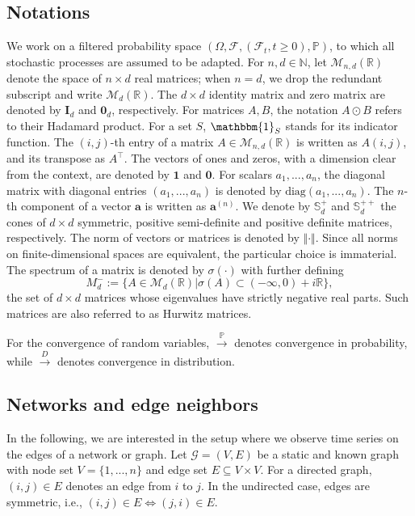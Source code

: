 \documentclass[12pt]{amsart}
\numberwithin{equation}{section}
\newcommand{\R}{\mathbb{R}}
\newcommand{\N}{\mathbb{N}}
\newcommand{\1}{\mathbf{1}}
\begin{document}
\subsection{Notations}
We work on a filtered probability space $(\Omega,\mathcal{F},(\mathcal{F}_t,t\geq 0),\mathbb{P})$, to which all stochastic processes are assumed to be adapted. For $n,d\in\N$, let $\mathcal{M}_{n,d}(\mathbb{R})$ denote the space of $n\times d$ real matrices; when $n=d$, we drop the redundant subscript and write $\mathcal{M}_{d}(\mathbb{R})$. The $d\times d$ identity matrix and zero matrix are denoted by $\mathbf{I}_{d}$ and $\mathbf{0}_{d}$, respectively. For matrices $A,B$, the notation $A\odot B$ refers to their Hadamard product. For a set $S$, $\mathbbm{1}_{S}$ stands for its indicator function. The $(i,j)$-th entry of a matrix $A\in\mathcal{M}_{n,d}(\mathbb{R})$ is written as $A(i,j)$, and its transpose as $A^{\top}$. The vectors of ones and zeros, with a dimension clear from the context, are denoted by $\mathbf{1}$ and $\mathbf{0}$. For scalars $a_1,...,a_n$, the diagonal matrix with diagonal entries $(a_1,...,a_n)$ is denoted by $\text{diag}(a_1,...,a_n)$. The $n$-th component of a vector $\mathbf{a}$ is written as $\mathbf{a}^{(n)}$. We denote by $\mathbb{S}_d^{+}$ and $\mathbb{S}_d^{++}$ the cones of $d\times d$ symmetric, positive semi-definite and positive definite matrices, respectively. The norm of vectors or matrices is denoted by $\Vert\cdot\Vert$. Since all norms on finite-dimensional spaces are equivalent, the particular choice is immaterial. The spectrum of a matrix is denoted by $\sigma(\cdot)$ with further defining
\begin{equation*}
    M_d^-:=\{A\in\mathcal{M}_{d}(\mathbb{R})\vert\sigma(A)\subset(-\infty,0)+i\R\},
\end{equation*}
the set of $d\times d$ matrices whose eigenvalues have strictly negative real parts. Such matrices are also referred to as Hurwitz matrices.

For the convergence of random variables, $\overset{\mathbb{P}}{\longrightarrow}$ denotes convergence in probability, while $\overset{D}{\longrightarrow}$ denotes convergence in distribution.

\subsection{Networks and edge neighbors} 
In the following, we are interested in the setup where we observe time series on the edges of a network or graph. Let $\mathcal{G}=(V,E)$ be a static and known graph with node set $V=\{1,...,n\}$ and edge set $E\subseteq V \times V$. For a directed graph, $(i,j)\in E$ denotes an edge from $i$ to $j$. In the undirected case, edges are symmetric, i.e., $(i,j)\in E\Leftrightarrow (j,i)\in E$.
\end{document}
